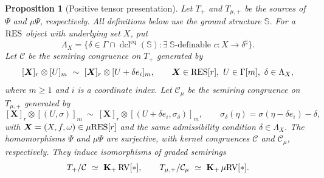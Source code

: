 \documentclass[12pt]{amsart}
\theoremstyle{plain}
\newtheorem{prop}[thm]{Proposition}
\theoremstyle{definition}
\theoremstyle{remark}
\numberwithin{equation}{section}
\theoremstyle{plain}
\newcommand{\RV}{\textup{RV}}
\DeclareMathOperator{\dcl}{dcl}
\newcommand{\0}{\emptyset}
\newcommand{\mgRV}{{\mu}{\RV}}
\newcommand{\RES}{\textup{RES}}
\newcommand{\mgRES}{{\mu}{\RES}}
\DeclareMathOperator{\gsk}{\mathbf{K}_+}
\begin{document}
\begin{prop}[Positive tensor presentation]\label{red:D:iso}
Let $T_+$ and $T_{\mu,+}$ be the sources of $\Psi$ and ${\mu}\Psi$,
respectively. All definitions below use the ground structure $\mathbb S$.
For a $\RES$ object with underlying set $X$, put
\[
 \Lambda_X=\{\delta\in\Gamma\cap\dcl^{\mathrm{eq}}(\mathbb S):
         \exists\ \mathbb S\text{-definable }c:X\to\delta^\sharp\}.
\]
Let $\mathcal C$ be the semiring congruence on $T_+$ generated by
\[
 [\bm X]_r\otimes[U]_m\ \sim\
 [\bm X]_r\otimes[U+\delta e_i]_m,
 \qquad \bm X\in\RES[r],\ U\in\Gamma[m],\ \delta\in\Lambda_X,
\]
where $m\geq1$ and $i$ is a coordinate index. Let $\mathcal C_\mu$
be the semiring congruence on $T_{\mu,+}$ generated by
\[
 [\bm X]_r\otimes[(U,\sigma)]_m\ \sim\
 [\bm X]_r\otimes[(U+\delta e_i,\sigma_\delta)]_m,
 \qquad \sigma_\delta(\eta)=\sigma(\eta-\delta e_i)-\delta,
\]
with $\bm X=(X,f,\omega)\in\mgRES[r]$ and the same admissibility
condition $\delta\in\Lambda_X$.
The homomorphisms $\Psi$ and ${\mu}\Psi$ are surjective, with kernel
congruences $\mathcal C$ and $\mathcal C_\mu$, respectively. They induce
isomorphisms of graded semirings
\[
 T_+/\mathcal C\ \simeq\ \gsk\RV[*],\qquad
 T_{\mu,+}/\mathcal C_\mu\ \simeq\ \gsk\mgRV[*].
\]
\end{prop}
\end{document}
